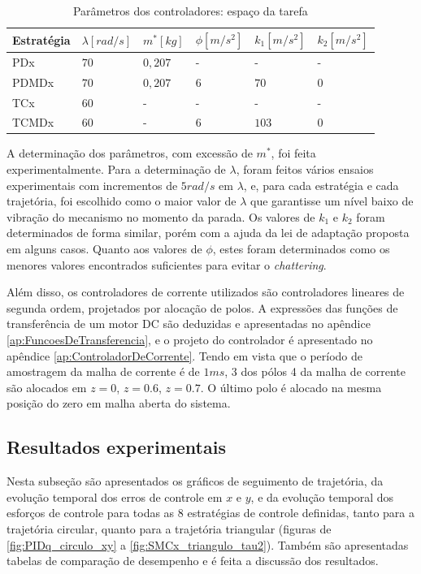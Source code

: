 \documentclass[]{politex}
\begin{document}
\begin{table}[H] 
\centering
\caption{Parâmetros dos controladores: espaço da tarefa}
\label{tab:parametrosControleEfetuador}
\begin{tabular}{l|l|l|l|l|l}
Estratégia & $\lambda [rad/s]$  & $m^*[kg]$ & $\phi[m/s^2]$ & $k_1[m/s^2]$ & $k_2[m/s^2]$ \\ \hline
PDx        & $70$               & $0{,}207$   & -             & -            & -            \\
PDMDx      & $70$               & $0{,}207$   & $6$           & $70$         & $0$          \\
TCx        & $60$               & -         & -             & -            & -            \\
TCMDx      & $60$               & -         & $6$           & $103$        & $0$          \\
\end{tabular}
\end{table}

A determinação dos parâmetros, com excessão de $m^*$, foi feita experimentalmente. Para a determinação de $\lambda$, foram feitos vários ensaios experimentais com incrementos de $5rad/s$ em $\lambda$, e, para cada estratégia e cada trajetória, foi escolhido como o maior valor de $\lambda$ que garantisse um nível baixo de vibração do mecanismo no momento da parada. Os valores de $k_1$ e $k_2$ foram determinados de forma similar, porém com a ajuda da lei de adaptação proposta em alguns casos. Quanto aos valores de $\phi$, estes foram determinados como os menores valores encontrados suficientes para evitar o \emph{chattering}.

Além disso, os controladores de corrente utilizados são controladores lineares de segunda ordem, projetados por alocação de polos. A expressões das funções de transferência de um motor DC são deduzidas e apresentadas no apêndice \ref{ap:FuncoesDeTransferencia}, e o projeto do controlador é apresentado no apêndice \ref{ap:ControladorDeCorrente}. Tendo em vista que o período de amostragem da malha de corrente é de $1ms$, 3 dos pólos 4 da malha de corrente são alocados em $z=0$, $z=0.6$, $z=0.7$. O último polo é alocado na mesma posição do zero em malha aberta do sistema.

\subsection{Resultados experimentais}

Nesta subseção são apresentados os gráficos de seguimento de trajetória, da evolução temporal dos erros de controle em $x$ e $y$, e da evolução temporal dos esforços de controle para todas as 8 estratégias de controle definidas, tanto para a trajetória circular, quanto para a trajetória triangular (figuras de \ref{fig:PIDq_circulo_xy} a \ref{fig:SMCx_triangulo_tau2}). Também são apresentadas tabelas de comparação de desempenho e é feita a discussão dos resultados.
\end{document}
